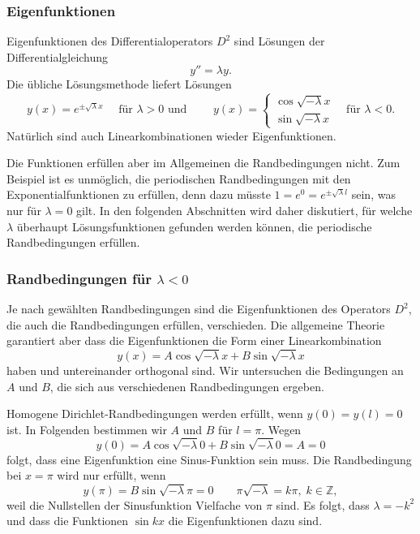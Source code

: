 %
%
\subsubsection{Eigenfunktionen}
Eigenfunktionen des Differentialoperators $D^2$ sind Lösungen der
Differentialgleichung
\[
y'' = \lambda y.
\]
Die übliche Lösungsmethode liefert Lösungen
\[
y(x) = e^{\pm\!\sqrt{\lambda} x} \quad
\text{ für $\lambda > 0$ und }
\qquad
y(x)
=
\begin{cases}
\cos\!\sqrt{-\lambda} x \\
\sin\!\sqrt{-\lambda} x
\end{cases}
\quad\text{für $\lambda < 0$.}
\]
Natürlich sind auch Linearkombinationen wieder Eigenfunktionen.

Die Funktionen erfüllen aber im Allgemeinen die Randbedingungen nicht.
Zum Beispiel ist es unmöglich, die periodischen Randbedingungen
mit den Exponentialfunktionen zu erfüllen, denn dazu müsste
$1=e^{0}=e^{\pm\!\sqrt{\lambda}l}$ sein, was nur für $\lambda=0$
gilt.
In den folgenden Abschnitten wird daher diskutiert, für welche $\lambda$
überhaupt Lösungsfunktionen gefunden werden können, die periodische
Randbedingungen erfüllen.

%
%
\subsubsection{Randbedingungen für $\lambda<0$}
Je nach gewählten Randbedingungen sind die Eigenfunktionen des Operators
$D^2$, die auch die Randbedingungen erfüllen, verschieden.
Die allgemeine Theorie garantiert aber dass die Eigenfunktionen die
Form einer Linearkombination
\begin{equation}
y(x)
=
A\cos \!\sqrt{-\lambda}x
+
B\sin \!\sqrt{-\lambda}x
\label{buch:orthofkt:pde:periodisch}
\end{equation}
haben und untereinander orthogonal sind.
Wir untersuchen die Bedingungen an $A$ und $B$, die sich aus verschiedenen
Randbedingungen ergeben.

Homogene Dirichlet-Randbedingungen werden erfüllt, wenn $y(0)=y(l)=0$ ist.
In Folgenden bestimmen wir $A$ und $B$ für $l=\pi$.
Wegen
\[
y(0)
=
A\cos \!\sqrt{-\lambda}0
+
B\sin \!\sqrt{-\lambda}0
=
A
=
0
\]
folgt, dass eine Eigenfunktion eine Sinus-Funktion sein muss.
Die Randbedingung bei $x=\pi$ wird nur erfüllt, wenn
\[
y(\pi)
=
B\sin\!\sqrt{-\lambda}\pi
=
0
\qquad
\pi\!\sqrt{-\lambda}
=
k\pi,\; k\in\mathbb{Z},
\]
weil die Nullstellen der Sinusfunktion Vielfache von $\pi$ sind.
Es folgt, dass $\lambda = -k^2$ und dass die Funktionen $\sin kx$
die Eigenfunktionen dazu sind.

